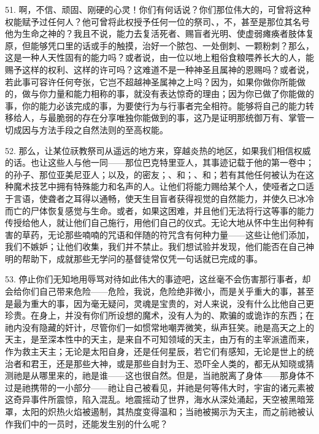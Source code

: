 51. 啊，不信、顽固、刚硬的心灵！你们有何话说？你们那位伟大的，可曾将这种权能赋予过任何人？他可曾将此权授予任何一位的祭司、，不，甚至是那位其名号他为生命之神的？我且不说，能力去复活死者、赐盲者光明、使虚弱瘫痪者肢体复原，但能够凭口里的话或手的触摸，治好一个脓包、一处倒刺、一颗粉刺？那么，这是一种人天性固有的能力吗？或者说，由一位以地上粗俗食粮喂养长大的人，能赐予这样的权利、这样的许可吗？这难道不是一种神圣且属神的恩赐吗？或者说，若此事可容许任何夸张，它岂不超越神圣属神之上吗？因为，如果你做你所能做的，做与你力量和能力相称的事，就没有表达惊奇的理由；因为你已做了你能做的事，你的能力必该完成的事，为要使行为与行事者完全相符。能够将自己的能力转移给人，与最脆弱的存在分享唯独你能做到的事，这乃是证明那统御万有、掌管一切成因与方法手段之自然法则的至高权能。\par

52. 那么，让某位祆教祭司从遥远的地方来，穿越炎热的地区，如果我们相信权威的话。也让这些人与他一同——那位巴克特里亚人，其事迹记载于他的第一卷中；的孙子、那位亚美尼亚人；以及，的密友；、和；、和；若有其他任何被认为在这种魔术技艺中拥有特殊能力和名声的人。让他们将能力赐给某个人，使哑者之口适于言语，使聋者之耳得以通畅，使天生目盲者获得视觉的自然能力，并使久已冰冷而亡的尸体恢复感觉与生命。或者，如果这困难，并且他们无法将行这等事的能力传授给他人，就让他们自己施行，用他们自己的仪式。无论大地从怀中生出何种有害的草药，无论那些喃喃的咒语和伴随的符咒含有何种力量——这些让他们添加，我们不嫉妒；让他们收集，我们并不禁止。我们想试验并发现，他们能否在自己神明的帮助下，成就那些无学问的基督徒常仅凭一句话就已完成的事。\par

53. 停止你们无知地用辱骂对待如此伟大的事迹吧，这丝毫不会伤害那行事者，却会给你们自己带来危险——危险，我说，危险绝非微小，而是关乎重大的事，甚至是最为重大的事，因为毫无疑问，灵魂是宝贵的，对人来说，没有什么比他自己更珍贵。在身上，并没有你们所设想的魔术，没有人为的、欺骗的或诡诈的东西；在祂内没有隐藏的奸计，尽管你们一如惯常地嘲弄微笑，纵声狂笑。祂是高天之上的天主，是至深本性中的天主，是来自不可知领域的天主，由万有的主宰派遣而来，作为救主天主；无论是太阳自身，还是任何星辰，若它们有感知，无论是世上的统治者和君王，还是那些大神，或是那些自封为王、恐吓全人类的，都无从知晓或猜测祂是从哪里来的，祂是谁——这也很自然。但是，当祂脱离了身体——那身体不过是祂携带的一小部分——祂让自己被看见，并祂是何等伟大时，宇宙的诸元素被这奇异事件所震惊，陷入混乱。地震摇动了世界，海水从深处涌起，天空被黑暗笼罩，太阳的炽热火焰被遏制，其热度变得温和；当祂被揭示为天主，而之前祂被认作我们中的一员时，还能发生别的什么呢？\par

